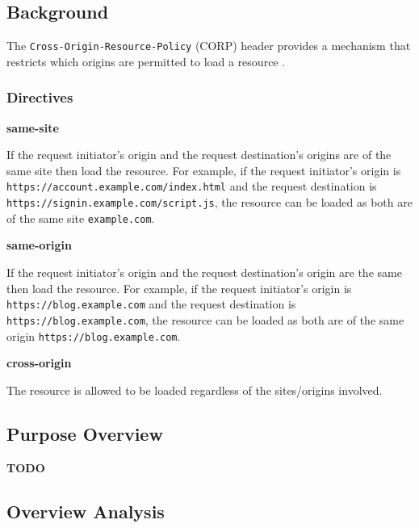 \documentclass{mscreport}
\begin{document}
\subsection{Background}

The \texttt{Cross-Origin-Resource-Policy} (CORP) header provides a mechanism that restricts which origins are permitted to load a resource \cite{Apple_undated-au}.

\subsubsection{Directives}
\textbf{same-site}

\vspace{0.3cm} \noindent
If the request initiator's origin and the request destination's origins are of the same site then load the resource. For example, if the request initiator's origin is \newline \texttt{https://account.example.com/index.html} and the request destination is \newline \texttt{https://signin.example.com/script.js}, the resource can be loaded as both are of the same site \texttt{example.com}.

\vspace{0.7cm} \noindent
\textbf{same-origin}

\vspace{0.3cm} \noindent
If the request initiator’s origin and the request destination’s origin are the same then load the resource. For example, if the request initiator’s origin is \texttt{https://blog.example.com} and the request destination is \texttt{https://blog.example.com}, the resource can be loaded as both are of the same origin \texttt{https://blog.example.com}.

\vspace{0.7cm} \noindent
\textbf{cross-origin}

\vspace{0.3cm} \noindent
The resource is allowed to be loaded regardless of the sites/origins involved.

\subsection{Purpose Overview}

\textbf{TODO}

\clearpage
\newpage

\subsection{Overview Analysis}
\end{document}
